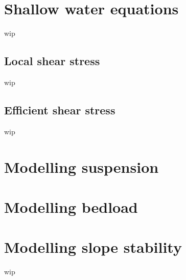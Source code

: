 \section{Shallow water equations} %
wip

\subsection{Local shear stress}
wip

\subsection{Efficient shear stress}
wip

\section{Modelling suspension}\label{susp_chap2}


\section{Modelling bedload}\label{bedload_chap2}


\section{Modelling slope stability}\label{slope_stab_chap2}
wip

